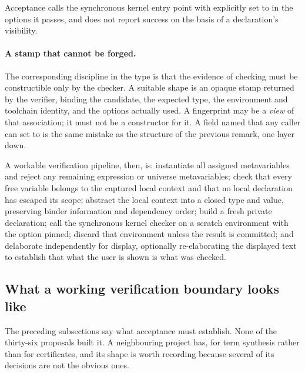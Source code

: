\begin{invariant}
\label{inv:sync}
Acceptance calls the synchronous kernel entry point with
 explicitly set to  in the options it
passes, and does not report success on the basis of a declaration's visibility.
\end{invariant}

\paragraph{A stamp that cannot be forged.}
The corresponding discipline in the type is that the evidence of checking must
be constructible only by the checker. A suitable shape is an opaque stamp
returned by the verifier, binding the candidate, the expected type, the
environment and toolchain identity, and the options actually used. A
fingerprint may be a \emph{view} of that association; it must not be a
constructor for it. A  field named  that any
caller can set to  is the same mistake as the 
structure of the previous remark, one layer down.

A workable verification pipeline, then, is: instantiate all assigned
metavariables and reject any remaining expression or universe metavariables;
check that every free variable belongs to the captured local context and that
no local declaration has escaped its scope; abstract the local context into a
closed type and value, preserving binder information and dependency order;
build a fresh private declaration; call the synchronous kernel checker on a
scratch environment with the option pinned; discard that environment unless the
result is committed; and delaborate independently for display, optionally
re-elaborating the displayed text to establish that what the user is shown is
what was checked.

\subsection{What a working verification boundary looks like}
\label{sec:boundary-impl}

The preceding subsections say what acceptance must establish. None of the
thirty-six proposals built it. A neighbouring project has, for term synthesis rather than
for certificates, and its shape is worth recording because several of its
decisions are not the obvious ones.


